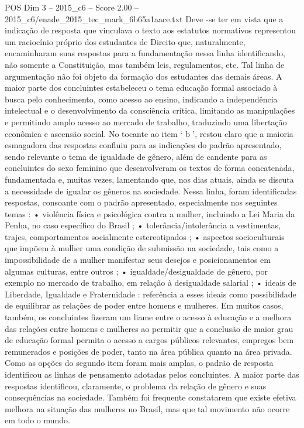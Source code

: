 \begin{textsample}{POS Dim 3 – 2015\_c6 – Score 2.00 – 2015\_c6/enade\_2015\_tec\_mark\_6b65a1aace.txt}
Deve -se ter em vista que a indicação de resposta que vinculava o texto aos estatutos normativos representou um raciocínio próprio dos estudantes de Direito que, naturalmente, encaminharam suas respostas para a fundamentação nessa linha identificando, não somente a Constituição, mas também leis, regulamentos, etc.
Tal linha de argumentação não foi objeto da formação dos estudantes das demais áreas.
A maior parte dos concluintes estabeleceu o tema educação formal associado à busca pelo conhecimento, como acesso ao ensino, indicando a independência intelectual e o desenvolvimento da consciência crítica, limitando as manipulações e permitindo amplo acesso ao mercado de trabalho, traduzindo uma libertação econômica e ascensão social.
No tocante ao item ‘ b ’, restou claro que a maioria esmagadora das respostas confluiu para as indicações do padrão apresentado, sendo relevante o tema de igualdade de gênero, além de candente para as concluintes do sexo feminino que desenvolveram os textos de forma concatenada, fundamentada e, muitas vezes, lamentando que, nos dias atuais, ainda se discuta a necessidade de igualar os gêneros na sociedade.
Nessa linha, foram identificadas respostas, consoante com o padrão apresentado, especialmente nos seguintes temas : • violência física e psicológica contra a mulher, incluindo a Lei Maria da Penha, no caso específico do Brasil ; • tolerância/intolerância a vestimentas, trajes, comportamentos socialmente estereotipados ; • aspectos socioculturais que impõem à mulher uma condição de submissão na sociedade, tais como a impossibilidade de a mulher manifestar seus desejos e posicionamentos em algumas culturas, entre outros ; • igualdade/desigualdade de gênero, por exemplo no mercado de trabalho, em relação à desigualdade salarial ; • ideais de Liberdade, Igualdade e Fraternidade : referência a esses ideais como possibilidade de equilibrar as relações de poder entre homens e mulheres.
Em muitos casos, também, os concluintes fizeram um liame entre o acesso à educação e a melhora das relações entre homens e mulheres ao permitir que a conclusão de maior grau de educação formal permita o acesso a cargos públicos relevantes, empregos bem remunerados e posições de poder, tanto na área pública quanto na área privada.
Como as opções do segundo item foram mais amplas, o padrão de resposta identificou as linhas de pensamento adotadas pelos concluintes.
A maior parte das respostas identificou, claramente, o problema da relação de gênero e suas consequências na sociedade.
Também foi frequente constatarem que existe efetiva melhora na situação das mulheres no Brasil, mas que tal movimento não ocorre em todo o mundo.

\end{textsample}
